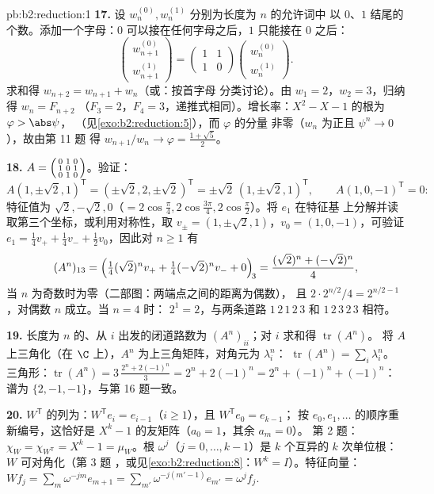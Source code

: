 \begin{solution}{pb:b2:reduction:1}
\textbf{17.} 设 $w_n^{(0)}, w_n^{(1)}$ 分别为长度为 $n$ 的允许词中
以 $0$、$1$ 结尾的个数。添加一个字母：$0$
可以接在任何字母之后，$1$ 只能接在 $0$ 之后：
\[
\begin{pmatrix} w_{n+1}^{(0)}\\ w_{n+1}^{(1)}\end{pmatrix}
= \begin{pmatrix} 1 & 1\\ 1 & 0\end{pmatrix}
\begin{pmatrix} w_n^{(0)}\\ w_n^{(1)}\end{pmatrix}.
\]
求和得 $w_{n+2} = w_{n+1} + w_n$（或：按首字母
分类讨论）。由 $w_1 = 2$，$w_2 = 3$，归纳得 $w_n = F_{n+2}$
（$F_3 = 2$，$F_4 = 3$，递推式相同）。增长率：$X^2 - X - 1$ 的根为
$\varphi > \abs\psi$，
（见\cref{exo:b2:reduction:5}），而 $\varphi$ 的分量
非零（$w_n$ 为正且 $\psi^n \to 0$），故由第 11 题
得 $w_{n+1}/w_n \to \varphi = \frac{1 + \sqrt5}2$。

\textbf{18.} $A = \begin{psmallmatrix} 0&1&0\\ 1&0&1\\
0&1&0\end{psmallmatrix}$。验证：
\[
A(1, \pm\sqrt2, 1)^{\mathsf T}
= (\pm\sqrt2, 2, \pm\sqrt2)^{\mathsf T}
= \pm\sqrt2\,(1, \pm\sqrt2, 1)^{\mathsf T},
\qquad
A(1, 0, -1)^{\mathsf T} = 0 :
\]
特征值为 $\sqrt2, -\sqrt2, 0$（$= 2\cos\frac\pi4,
2\cos\frac{3\pi}4, 2\cos\frac\pi2$）。将 $e_1$ 在特征基
上分解并读取第三个坐标，或利用对称性，取
$v_\pm = (1, \pm\sqrt2, 1)$，$v_0 = (1, 0, -1)$，可验证 $e_1
= \frac14 v_+ + \frac14 v_- + \frac12 v_0$，因此对 $n \geq 1$ 有
\[
(A^n)_{13} = \Bigl(\tfrac14(\sqrt2)^n v_+ +
\tfrac14(-\sqrt2)^n v_- + 0\Bigr)_{\!3}
= \frac{(\sqrt2)^n + (-\sqrt2)^n}{4},
\]
当 $n$ 为奇数时为零（二部图：两端点之间的距离为偶数），
且 $2\cdot 2^{n/2}/4 = 2^{n/2 - 1}$，对偶数 $n$ 成立。当 $n = 4$ 时：
$2^{1} = 2$，与两条道路 $1\,2\,1\,2\,3$ 和
$1\,2\,3\,2\,3$ 相符。

\textbf{19.} 长度为 $n$ 的、从 $i$ 出发的闭道路数为
$(A^n)_{ii}$；对 $i$ 求和得 $\operatorname{tr}(A^n)$。
将 $A$ 上三角化（在 $\C$ 上），$A^n$ 为上三角矩阵，对角元为 $\lambda_i^n$：
$\operatorname{tr}(A^n) = \sum_i\lambda_i^n$。
三角形：$\operatorname{tr}(A^n) = 3\,\frac{2^n + 2(-1)^n}3 =
2^n + 2(-1)^n = 2^n + (-1)^n + (-1)^n$：谱为 $\{2, -1,
-1\}$，与第 16 题一致。

\textbf{20.} $W^{\mathsf T}$ 的列为：$W^{\mathsf T}e_i =
e_{i-1}$（$i \geq 1$），且 $W^{\mathsf T}e_0 = e_{k-1}$；
按 $e_0, e_1, \dots$ 的顺序重新编号，这恰好是
$X^k - 1$ 的友矩阵（$a_0 = 1$，其余 $a_m = 0$）。
第 2 题：$\chi_{W} = \chi_{W^{\mathsf T}} = X^k - 1 =
\mu_{W}$。根 $\omega^j$（$j = 0, \dots, k-1$）是 $k$
个互异的 $k$ 次单位根：$W$ 可对角化（第 3 题
，或见\cref{exo:b2:reduction:8}：$W^k = I$）。特征向量：$Wf_j
= \sum_m \omega^{-jm}e_{m+1} = \sum_{m'}\omega^{-j(m'-1)}e_{m'}
= \omega^j f_j$.


\end{solution}
